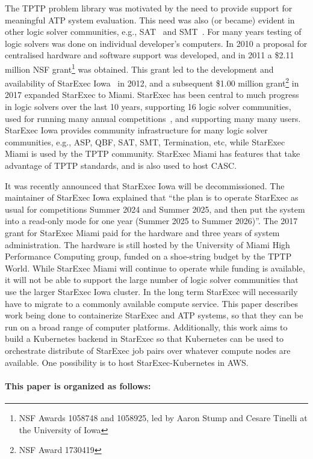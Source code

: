 \documentclass{easychair}
\begin{document}
The TPTP problem library was motivated by the need to provide support for meaningful ATP system 
evaluation.
This need was also (or became) evident in other logic solver communities, e.g., 
SAT~\cite{HS00-SATLIB} and SMT~\cite{BST10}.
For many years testing of logic solvers was done on individual developer's computers. 
In 2010 a proposal for centralised hardware and software support was developed,
and in 2011 a \$2.11 million NSF grant\footnote{%
NSF Awards 1058748 and 1058925, led by Aaron Stump and Cesare Tinelli at the University of Iowa} 
was obtained.
This grant led to the development and availability of StarExec Iowa~\cite{SST14} in 2012,
and a subsequent \$1.00 million grant\footnote{%
NSF Award 1730419} in 2017 expanded StarExec to Miami.
StarExec has been central to much progress in logic solvers over the last 10 years, supporting
16 logic solver communities, used for running many annual competitions~\cite{BB+19}, and 
supporting many many users.
StarExec Iowa provides community infrastructure for many logic solver communities,
e.g., ASP, QBF, SAT, SMT, Termination, etc, while
StarExec Miami is used by the TPTP community.
StarExec Miami has features that take advantage of TPTP standards, and is also used to host CASC.

It was recently announced that StarExec Iowa will be decommissioned. 
The maintainer of StarExec Iowa explained that ``the plan is to operate StarExec as usual for 
competitions Summer 2024 and Summer 2025, and then put the system into a read-only mode for one 
year (Summer 2025 to Summer 2026)''.
The 2017 grant for StarExec Miami paid for the hardware and three years of system administration.
The hardware is still hosted by the University of Miami High Performance Computing group,
funded on a shoe-string budget by the TPTP World.
While StarExec Miami will continue to operate while funding is available, it will not be able
to support the large number of logic solver communities that use the larger StarExec Iowa cluster.
In the long term StarExec will necessarily have to migrate to a commonly available compute service.
This paper describes work being done to containerize StarExec and ATP systems, so that they can 
be run on a broad range of computer platforms.
Additionally, this work aims to build a Kubernetes backend in StarExec so that Kubernetes can
be used to orchestrate distribute of StarExec job pairs over whatever compute nodes are available.
One possibility is to host StarExec-Kubernetes in AWS.

\paragraph{This paper is organized as follows:}
\end{document}
